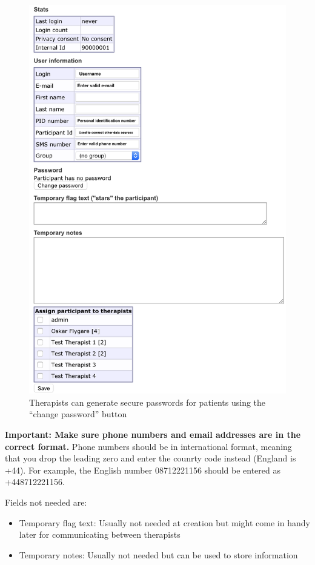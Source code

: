 \documentclass[]{book}
\providecommand{\tightlist}{%
  \setlength{\itemsep}{0pt}\setlength{\parskip}{0pt}}
\begin{document}
\begin{figure}
\centering
\includegraphics{images/new-participant.png}
\caption{Therapists can generate secure passwords for patients using the ``change password'' button}
\end{figure}

\textbf{Important: Make sure phone numbers and email addresses are in the correct format.} Phone numbers should be in international format, meaning that you drop the leading zero and enter the counrty code instead (England is +44). For example, the English number 08712221156 should be entered as +448712221156.

Fields not needed are:

\begin{itemize}
\tightlist
\item
  Temporary flag text: Usually not needed at creation but might come in handy later for communicating between therapists
\item
  Temporary notes: Usually not needed but can be used to store information
\end{itemize}
\end{document}
